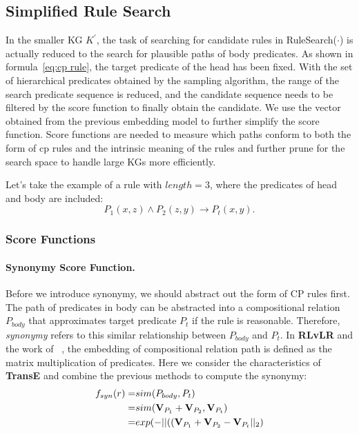 \documentclass{article}
\begin{document}
	\subsection{Simplified Rule Search}
	In the smaller KG $K^{'}$, the task of searching for candidate rules in \textsf{RuleSearch($\cdot$)} is actually reduced to the search for plausible paths of body predicates. As shown in formula~\ref{eq:cp rule}, the target predicate of the head has been fixed. With the set of hierarchical predicates obtained by the sampling algorithm, the range of the search predicate sequence is reduced, and the candidate sequence needs to be filtered by the score function to finally obtain the candidate. We use the vector obtained from the previous embedding model to further simplify the score function.
	Score functions are needed to measure which paths conform to both the form of cp rules and the intrinsic meaning of the rules and further prune for the search space to handle large KGs more efficiently. 
	
	Let's take the example of a rule with $length=3$, where the predicates of head and body are included:
	\begin{equation}
	P_1(x, z) \wedge P_2(z, y)  \to P_t(x, y). \nonumber
	\end{equation}
	
	\subsubsection{Score Functions}
	\paragraph{Synonymy Score Function.}
	Before we introduce synonymy, we should abstract out the form of CP rules first. The path of predicates in body can be abstracted into a compositional relation $P_{body}$ that approximates target predicate $P_t$ if the rule is reasonable. Therefore, \textit{synonymy} refers to this similar relationship between $P_{body}$ and $P_t$. In {\bf RLvLR} and the work of ~\cite{Yang:2015}, the embedding of compositional relation path is defined as the matrix multiplication of predicates. Here we consider the characteristics of {\bf TransE} and combine the previous methods to compute the synonymy:
	\begin{align}
		f_{syn}(r) = & sim(P_{body},P_t)\\
		= &sim({\bf V}_{P_1} + {\bf V}_{P_2}, {\bf V}_{P_t}) \nonumber\\
		= & exp(-||(({\bf V}_{P_1}+ {\bf V}_{P_2} - {\bf V}_{P_t}||_2) \nonumber
	\end{align}
	
\end{document}
